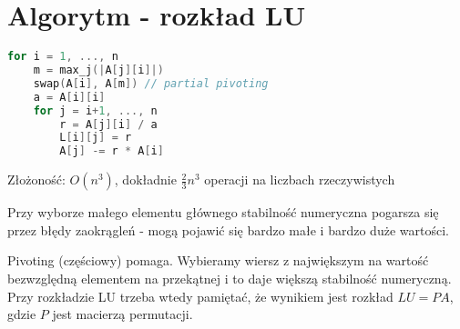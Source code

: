 \section{Algorytm - rozkład LU}
\begin{lstlisting}[language=Cpp]
for i = 1, ..., n
    m = max_j(|A[j][i]|)
    swap(A[i], A[m]) // partial pivoting
    a = A[i][i]
    for j = i+1, ..., n
        r = A[j][i] / a
        L[i][j] = r
        A[j] -= r * A[i]
\end{lstlisting}
\noindent
Złożoność: \( O(n^3) \), dokładnie \( \frac{2}{3}n^3 \) operacji na liczbach rzeczywistych

\begin{warning}
Przy wyborze małego elementu głównego stabilność numeryczna pogarsza się przez błędy zaokrągleń - mogą pojawić się bardzo małe i bardzo duże wartości.
\end{warning}

Pivoting (częściowy) pomaga. Wybieramy wiersz z największym na wartość bezwzględną elementem na przekątnej i to daje większą stabilność numeryczną. Przy rozkładzie LU trzeba wtedy pamiętać, że wynikiem jest rozkład \( LU = PA \), gdzie \( P \) jest macierzą permutacji.
